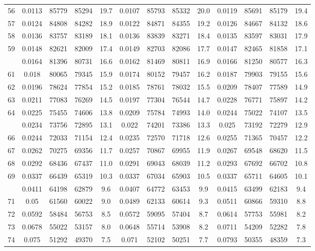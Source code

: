 \documentclass[
  14pt,
]{article}
\begin{document}
\begin{longtable}[t]{lcccccccccccc}
56 & 0.0113 & 85779 & 85294 & 19.7 & 0.0107 & 85793 & 85332 & 20.0 & 0.0119 & 85691 & 85179 & 19.4\\
57 & 0.0124 & 84808 & 84282 & 18.9 & 0.0122 & 84871 & 84355 & 19.2 & 0.0126 & 84667 & 84132 & 18.6\\
58 & 0.0136 & 83757 & 83189 & 18.1 & 0.0136 & 83839 & 83271 & 18.4 & 0.0135 & 83597 & 83031 & 17.9\\
59 & 0.0148 & 82621 & 82009 & 17.4 & 0.0149 & 82703 & 82086 & 17.7 & 0.0147 & 82465 & 81858 & 17.1\\
\addlinespace
60 & 0.0164 & 81396 & 80731 & 16.6 & 0.0162 & 81469 & 80811 & 16.9 & 0.0166 & 81250 & 80577 & 16.3\\
61 & 0.018 & 80065 & 79345 & 15.9 & 0.0174 & 80152 & 79457 & 16.2 & 0.0187 & 79903 & 79155 & 15.6\\
62 & 0.0196 & 78624 & 77854 & 15.2 & 0.0185 & 78761 & 78032 & 15.5 & 0.0209 & 78407 & 77589 & 14.9\\
63 & 0.0211 & 77083 & 76269 & 14.5 & 0.0197 & 77304 & 76544 & 14.7 & 0.0228 & 76771 & 75897 & 14.2\\
64 & 0.0225 & 75455 & 74606 & 13.8 & 0.0209 & 75784 & 74993 & 14.0 & 0.0244 & 75022 & 74107 & 13.5\\
\addlinespace
65 & 0.0234 & 73756 & 72895 & 13.1 & 0.022 & 74201 & 73386 & 13.3 & 0.025 & 73192 & 72279 & 12.9\\
66 & 0.0244 & 72033 & 71154 & 12.4 & 0.0235 & 72570 & 71718 & 12.6 & 0.0255 & 71365 & 70457 & 12.2\\
67 & 0.0262 & 70275 & 69356 & 11.7 & 0.0257 & 70867 & 69955 & 11.9 & 0.0267 & 69548 & 68620 & 11.5\\
68 & 0.0292 & 68436 & 67437 & 11.0 & 0.0291 & 69043 & 68039 & 11.2 & 0.0293 & 67692 & 66702 & 10.8\\
69 & 0.0337 & 66439 & 65319 & 10.3 & 0.0337 & 67034 & 65903 & 10.5 & 0.0337 & 65711 & 64605 & 10.1\\
\addlinespace
70 & 0.0411 & 64198 & 62879 & 9.6 & 0.0407 & 64772 & 63453 & 9.9 & 0.0415 & 63499 & 62183 & 9.4\\
71 & 0.05 & 61560 & 60022 & 9.0 & 0.0489 & 62133 & 60614 & 9.3 & 0.0511 & 60866 & 59310 & 8.8\\
72 & 0.0592 & 58484 & 56753 & 8.5 & 0.0572 & 59095 & 57404 & 8.7 & 0.0614 & 57753 & 55981 & 8.2\\
73 & 0.0678 & 55022 & 53157 & 8.0 & 0.0648 & 55714 & 53908 & 8.2 & 0.0711 & 54209 & 52282 & 7.8\\
74 & 0.075 & 51292 & 49370 & 7.5 & 0.071 & 52102 & 50251 & 7.7 & 0.0793 & 50355 & 48359 & 7.3\\

\end{longtable}
\end{document}
